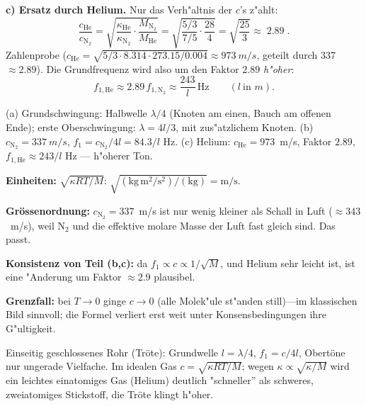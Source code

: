 \textbf{c) Ersatz durch Helium.} Nur das Verh"altnis der $c$'s z"ahlt:
\begin{equation}
  \frac{c_{\mathrm{He}}}{c_{\mathrm{N}_2}}
  =\sqrt{\frac{\kappa_{\mathrm{He}}}{\kappa_{\mathrm{N}_2}}
  \cdot\frac{M_{\mathrm{N}_2}}{M_{\mathrm{He}}}}
  =\sqrt{\frac{5/3}{7/5}\cdot\frac{28}{4}}
  =\sqrt{\frac{25}{3}}
  \approx\boxed{\;2.89\;}.
\end{equation}
Zahlenprobe ($c_{\mathrm{He}}=\sqrt{5/3\cdot8.314\cdot273.15/0.004}
\approx\qty{973}{m/s}$, geteilt durch 337 $\approx2.89$). Die
Grundfrequenz wird also um den Faktor $2.89$ \emph{h"oher}:
\begin{equation}
  f_{1,\mathrm{He}}\approx 2.89\,f_{1,\mathrm{N}_2}\approx\frac{243}{l}
  \,\mathrm{Hz}\qquad(l\ \text{in } m).
\end{equation}

\begin{ergebnis}
(a) Grundschwingung: Halbwelle $\lambda/4$ (Knoten am einen, Bauch am
offenen Ende); \checkmark
erste Oberschwingung: $\lambda=4l/3$, mit zus"atzlichem Knoten.
(b) $c_{\mathrm{N}_2}=\qty{337}{m/s}$,
$f_1=c_{\mathrm{N}_2}/4l=84.3/l$ Hz.
(c) Helium: $c_{\mathrm{He}}=973$~m/s, Faktor $2.89$,
$f_{1,\mathrm{He}}\approx243/l$ Hz --- h"oherer Ton.
\end{ergebnis}

\begin{kontrolle}
\textbf{Einheiten:} $\sqrt{\kappa R T/M}$:
$\sqrt{(\mathrm{kg\,m^2/s^2})/(\mathrm{kg})}=\mathrm{m/s}$. \checkmark

\textbf{Grössenordnung:} $c_{\mathrm{N}_2}=337$~m/s ist nur wenig kleiner als
Schall in Luft ($\approx343$~m/s), weil N$_2$ und die effektive molare Masse
der Luft fast gleich sind. Das passt.\ \checkmark

\textbf{Konsistenz von Teil (b,c):} da $f_1\propto c\propto1/\sqrt M$, und Helium
sehr leicht ist, ist eine "Anderung um Faktor $\approx2.9$ plausibel.
\checkmark

\textbf{Grenzfall:} bei $T\to0$ ginge $c\to0$ (alle Molek"ule st"anden
still)---im klassischen Bild sinnvoll; die Formel verliert erst weit unter
Konsensbedingungen ihre G"ultigkeit.
\end{kontrolle}

\begin{merksatz}
Einseitig geschlossenes Rohr (Tröte): Grundwelle $l=\lambda/4$, $f_1=c/4l$,
Obertöne nur ungerade Vielfache. Im idealen Gas
$c=\sqrt{\kappa R T/M}$; wegen $\kappa\propto\sqrt{\kappa/M}$ wird ein
leichtes einatomiges Gas (Helium) deutlich "schneller'' als schweres,
zweiatomiges Stickstoff, die Tröte klingt h"oher.
\end{merksatz}
